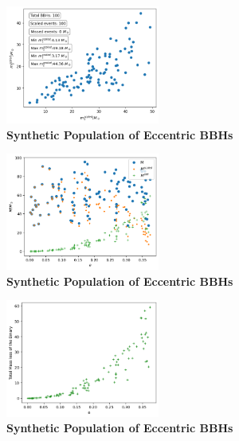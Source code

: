 \documentclass[twocolumn,prd,nofootinbib]{revtex4}
\newcommand\Y[1]{{{}_{#1}Y}}
\begin{document}
\begin{figure}
\includegraphics[width=0.45\textwidth]{paper/figures/pop2d038scl.png}
\caption{\label{fig:population05}\textbf{Synthetic Population of Eccentric BBHs}}
\end{figure}
\begin{figure}
\includegraphics[width=0.45\textwidth]{paper/figures/pop2d038diff.png}
\caption{\label{fig:population05}\textbf{Synthetic Population of Eccentric BBHs}}
\end{figure}
\begin{figure}
\includegraphics[width=0.45\textwidth]{paper/figures/massloss038.png}
\caption{\label{fig:population05}\textbf{Synthetic Population of Eccentric BBHs}}
\end{figure}


\end{document}
